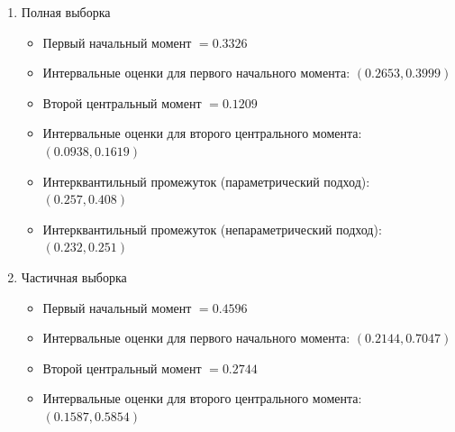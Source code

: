 \documentclass[a4paper,12pt]{article}
\begin{document}
    \begin{enumerate}
        \item Полная выборка
        \begin{itemize}
            \item Первый начальный момент $= 0.3326$
            \item Интервальные оценки для первого начального момента: $(0.2653, 0.3999)$
            \item Второй центральный момент $= 0.1209$
            \item Интервальные оценки для второго центрального момента: $(0.0938, 0.1619)$
            \item Интерквантильный промежуток (параметрический подход): $(0.257, 0.408)$
            \item Интерквантильный промежуток (непараметрический подход): $(0.232, 0.251)$
        \end{itemize}
        \item Частичная выборка
        \begin{itemize}
            \item Первый начальный момент $= 0.4596$
            \item Интервальные оценки для первого начального момента: $(0.2144, 0.7047)$
            \item Второй центральный момент $= 0.2744$
            \item Интервальные оценки для второго центрального момента: $(0.1587, 0.5854)$
        \end{itemize}
    \end{enumerate}
    
\end{document}
